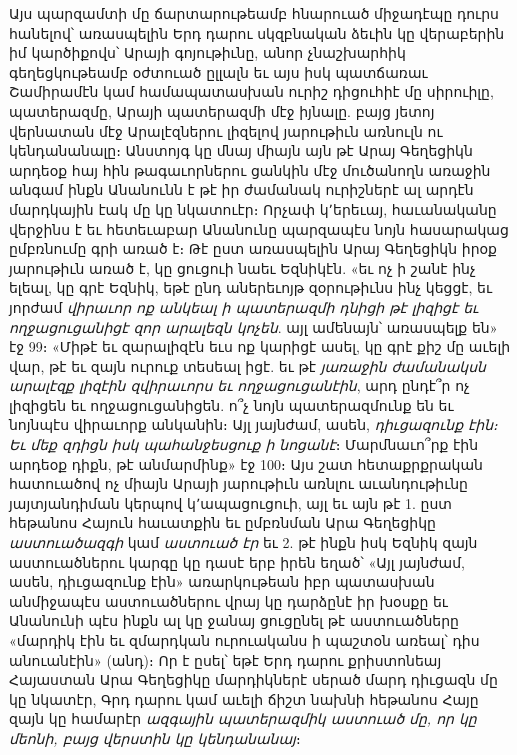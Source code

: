 \documentclass{article}
\begin{document}
{Այս պարզամտի մը ճարտարութեամբ հնարուած միջադէպը դուրս հանելով՝ առասպելին Երդ դարու սկզբնական ձեւին կը վերաբերին իմ կարծիքովս՝ Արայի գոյութիւնը, անոր չնաշխարհիկ գեղեցկութեամբ օժտուած ըլլալն եւ այս իսկ պատճառաւ Շամիրամէն կամ համապատասխան ուրիշ դիցուհիէ մը սիրուիլը, պատերազմը, Արայի պատերազմի մէջ իյնալը. բայց յետոյ վերնատան մէջ Արալէզներու լիզելով յարութիւն առնուլն ու կենդանանալը։ Անստոյգ կը մնայ միայն այն թէ Արայ Գեղեցիկն արդեօք հայ հին թագաւորներու ցանկին մէջ մուծանողն առաջին անգամ ինքն Անանունն է թէ իր ժամանակ ուրիշներէ ալ արդէն մարդկային էակ մը կը նկատուէր։ Որչափ կ՚երեւայ, հաւանականը վերջինս է եւ հետեւաբար Անանունը պարզապէս նոյն հասարակաց ըմբռնումը գրի առած է։ Թէ ըստ առասպելին Արայ Գեղեցիկն իրօք յարութիւն առած է, կը ցուցուի նաեւ Եզնիկէն. «եւ ոչ ի շանէ ինչ ելեալ, կը գրէ Եզնիկ, եթէ ընդ աներեւոյթ զօրութիւնս ինչ կեցցէ, եւ յորժամ \emph{վիրաւոր ոք անկեալ ի պատերազմի դնիցի թէ լիզիցէ եւ ողջացուցանիցէ զոր արալեզն կոչեն}. այլ ամենայն՝ առասպելք են» էջ 99։ «Միթէ եւ զարալիզէն եւս ոք կարիցէ ասել, կը գրէ քիշ մը աւելի վար, թէ եւ զայն ուրուք տեսեալ իցէ. եւ թէ \emph{յառաջին ժամանակսն արալէզք լիզէին զվիրաւորս եւ ողջացուցանէին}, արդ ընդէ՞ր ոչ լիզիցեն եւ ողջացուցանիցեն. ո՞չ նոյն պատերազմունք են եւ նոյնպէս վիրաւորք անկանին։ Այլ յայնժամ, ասեն, \emph{դիւցազունք էին։ Եւ մեք զդիցն իսկ պահանջեսցուք ի նոցանէ}։ Մարմնաւո՞րք էին արդեօք դիքն, թէ անմարմինք» էջ 100։ Այս շատ հետաքրքրական հատուածով ոչ միայն Արայի յարութիւն առնլու աւանդութիւնը յայտյանդիման կերպով կ՚ապացուցուի, այլ եւ այն թէ 1. ըստ հեթանոս Հայուն հաւատքին եւ ըմբռնման Արա Գեղեցիկը \emph{աստուածազգի} կամ \emph{աստուած էր} եւ 2. թէ ինքն իսկ Եզնիկ զայն աստուածներու կարգը կը դասէ երբ իրեն եղած՝ «Այլ յայնժամ, ասեն, դիւցազունք էին» առարկութեան իբր պատասխան անմիջապէս աստուածներու վրայ կը դարձընէ իր խօսքը եւ Անանունի պէս ինքն ալ կը ջանայ ցուցընել թէ աստուածները «մարդիկ էին եւ զմարդկան ուրուականս ի պաշտօն առեալ՝ դիս անուանէին» (անդ)։ Որ է ըսել՝ եթէ Երդ դարու քրիստոնեայ Հայաստան Արա Գեղեցիկը մարդիկներէ սերած մարդ դիւցազն մը կը նկատէր, Գրդ դարու կամ աւելի ճիշտ նախնի հեթանոս Հայը զայն կը համարէր \emph{ազգային պատերազմիկ աստուած մը, որ կը մեոնի, բայց վերստին կը կենդանանայ}։}
\clearpage
\subsection{}
\end{document}
